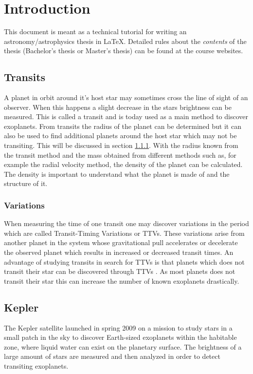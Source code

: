 \documentclass[12pt]{report}
\begin{document}
\chapter{Introduction}

This document is meant as a technical tutorial for writing an
astronomy/astrophysics thesis in LaTeX. Detailed rules about the {\it contents}
of the thesis (Bachelor's thesis or Master's thesis) can be found at the course
websites.

\section{Transits}
	A planet in orbit around it's host star may sometimes cross the line of sight of an observer. When this happens a slight decrease in the stars brightness can be measured. This is called a transit and is today used as a main method to discover exoplanets. From transits the radius of the planet can be determined but it can also be used to find additional planets around the host star which may not be transiting. This will be discussed in section \ref{sec:trans_vari}. With the radius known from the transit method and the mass obtained from different methods such as, for example the radial velocity method, the density of the planet can be calculated. The density is important to understand what the planet is made of and the structure of it.

\subsection{Variations}
\label{sec:trans_vari}

	When measuring the time of one transit one may discover variations in the period which are called Transit-Timing Variations or TTVs. These variations arise from another planet in the system whose gravitational pull accelerates or decelerate the observed planet which results in increased or decreased transit times. An advantage of studying transits in search for TTVs is that planets which does not transit their star can be discovered through TTVs \citep{0004-637X-777-1-3}. As most planets does not transit their star this can increase the number of known exoplanets drastically.

\section{Kepler}
	The Kepler satellite launched in spring 2009 on a mission to study stars in a small patch in the sky to discover Earth-sized exoplanets within the habitable zone, where liquid water can exist on the planetary surface. The brightness of a large amount of stars are measured and then analyzed in order to detect transiting exoplanets.
	
\end{document}
